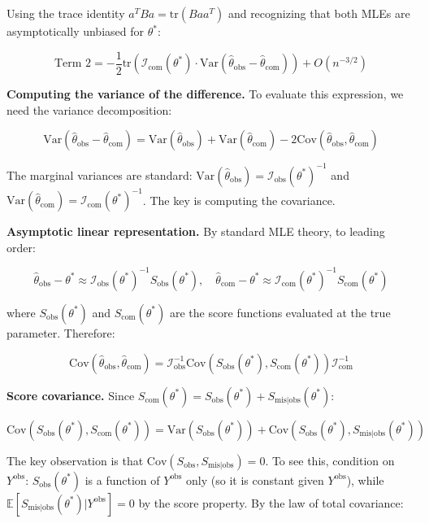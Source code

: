 \documentclass[
]{article}
\begin{document}
Using the trace identity \(a^T B a = \text{tr}(B a a^T)\) and
recognizing that both MLEs are asymptotically unbiased for \(\theta^*\):

\[\text{Term 2} = -\frac{1}{2}\text{tr}\left(\mathcal{I}_{\text{com}}(\theta^*) \cdot \text{Var}(\hat{\theta}_{\text{obs}} - \hat{\theta}_{\text{com}})\right) + O(n^{-3/2})\]

\textbf{Computing the variance of the difference.} To evaluate this
expression, we need the variance decomposition:

\[\text{Var}(\hat{\theta}_{\text{obs}} - \hat{\theta}_{\text{com}}) = \text{Var}(\hat{\theta}_{\text{obs}}) + \text{Var}(\hat{\theta}_{\text{com}}) - 2\text{Cov}(\hat{\theta}_{\text{obs}}, \hat{\theta}_{\text{com}})\]

The marginal variances are standard:
\(\text{Var}(\hat{\theta}_{\text{obs}}) = \mathcal{I}_{\text{obs}}(\theta^*)^{-1}\)
and
\(\text{Var}(\hat{\theta}_{\text{com}}) = \mathcal{I}_{\text{com}}(\theta^*)^{-1}\).
The key is computing the covariance.

\textbf{Asymptotic linear representation.} By standard MLE theory, to
leading order:

\[\hat{\theta}_{\text{obs}} - \theta^* \approx \mathcal{I}_{\text{obs}}(\theta^*)^{-1} S_{\text{obs}}(\theta^*), \quad \hat{\theta}_{\text{com}} - \theta^* \approx \mathcal{I}_{\text{com}}(\theta^*)^{-1} S_{\text{com}}(\theta^*)\]

where \(S_{\text{obs}}(\theta^*)\) and \(S_{\text{com}}(\theta^*)\) are
the score functions evaluated at the true parameter. Therefore:

\[\text{Cov}(\hat{\theta}_{\text{obs}}, \hat{\theta}_{\text{com}}) = \mathcal{I}_{\text{obs}}^{-1} \text{Cov}(S_{\text{obs}}(\theta^*), S_{\text{com}}(\theta^*)) \mathcal{I}_{\text{com}}^{-1}\]

\textbf{Score covariance.} Since
\(S_{\text{com}}(\theta^*) = S_{\text{obs}}(\theta^*) + S_{\text{mis}|\text{obs}}(\theta^*)\):

\[\text{Cov}(S_{\text{obs}}(\theta^*), S_{\text{com}}(\theta^*)) = \text{Var}(S_{\text{obs}}(\theta^*)) + \text{Cov}(S_{\text{obs}}(\theta^*), S_{\text{mis}|\text{obs}}(\theta^*))\]

The key observation is that
\(\text{Cov}(S_{\text{obs}}, S_{\text{mis}|\text{obs}}) = 0\). To see
this, condition on \(Y^{\text{obs}}\): \(S_{\text{obs}}(\theta^*)\) is a
function of \(Y^{\text{obs}}\) only (so it is constant given
\(Y^{\text{obs}}\)), while
\(\mathbb{E}[S_{\text{mis}|\text{obs}}(\theta^*) | Y^{\text{obs}}] = 0\)
by the score property. By the law of total covariance:
\end{document}
